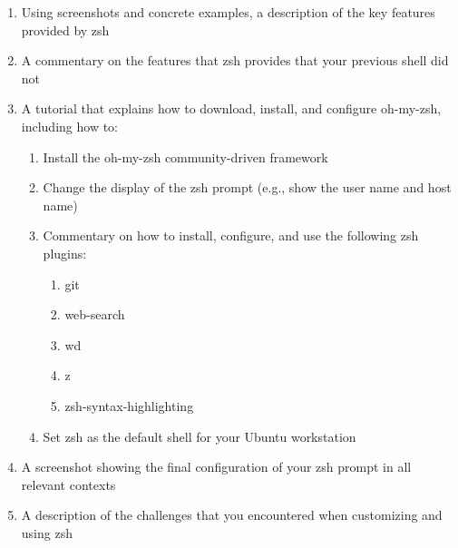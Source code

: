 \begin{enumerate}
	
	\item Using screenshots and concrete examples, a description of the key features provided by zsh

	\item A commentary on the features that zsh provides that your previous shell did not

	\item A tutorial that explains how to download, install, and configure oh-my-zsh, including how to:

	  \begin{enumerate}

	    \item Install the oh-my-zsh community-driven framework

	    \item Change the display of the zsh prompt (e.g., show the user name and host name)

	    \item Commentary on how to install, configure, and use the following zsh plugins:

	      \begin{enumerate}

	        \item git
		  
		\item web-search

		\item wd 	

		\item z

		\item zsh-syntax-highlighting

	      \end{enumerate}

	    \item Set zsh as the default shell for your Ubuntu workstation

	  \end{enumerate}

	\item A screenshot showing the final configuration of your zsh prompt in all relevant contexts

	\item A description of the challenges that you encountered when customizing and using zsh

\end{enumerate}

